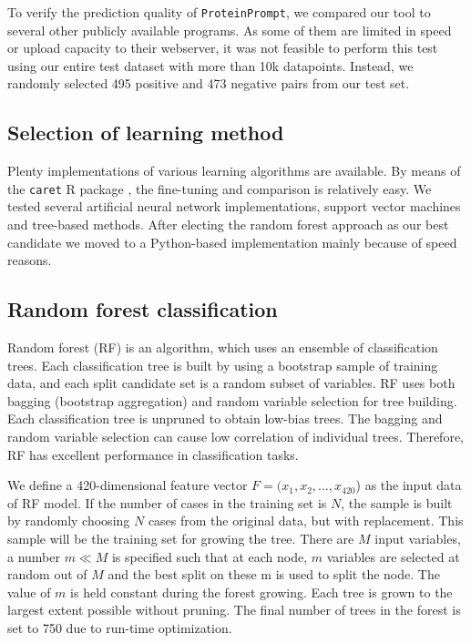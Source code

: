 \documentclass[preprint,3p,times,twocolumn]{elsarticle}
\newcommand{\tool}{\texttt{ProteinPrompt}\hspace{2pt}}
\begin{document}
To verify the prediction quality of \tool, we compared our tool to
several other publicly available programs. As some of them are limited
in speed or upload capacity to their webserver, it was not
feasible to perform this test using our entire test dataset with more
than 10k datapoints. Instead, we randomly selected 495 positive and 473
negative pairs from our test set.

\subsection{Selection of learning method}
Plenty implementations of various learning algorithms are
available. By means of the \texttt{caret} R package \cite{Kuhn:2008},
the fine-tuning and comparison is relatively easy. We tested several
artificial neural network implementations, support vector machines and
tree-based methods. After electing the random forest approach as our
best candidate we moved to a Python-based implementation mainly
because of speed reasons.  

\subsection{Random forest classification}
Random forest (RF) is an algorithm, which uses an ensemble of
classification trees. Each classification tree is built by using a
bootstrap sample of training data, and each split candidate set is a
random subset of variables. RF uses both bagging (bootstrap
aggregation) and random variable selection for tree building. Each
classification tree is unpruned to obtain low-bias trees. The bagging
and random variable selection can cause low correlation of individual
trees. Therefore, RF has excellent performance in classification
tasks. 

We define a 420-dimensional feature vector $F=(x_1,x_2,
\dots,x_{420}$) as the input data of RF model. If the number of cases
in the training set is $N$, the sample is built by randomly choosing
$N$ cases from the original data, but with replacement. This sample
will be the training set for growing the tree. There are $M$ input
variables, a number $m \ll M$ is specified such that at each node, $m$
variables are selected at random out of $M$ and the best split on
these m is used to split the node. The value of $m$ is held constant
during the forest growing. Each tree is grown to the largest extent
possible without pruning. The final number of trees in the forest is
set to 750 due to run-time optimization. 
\end{document}
